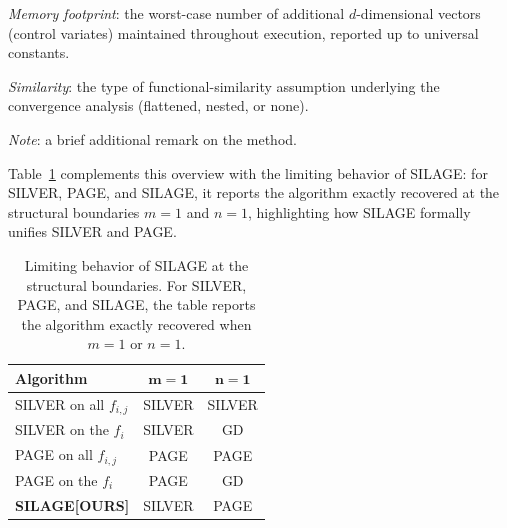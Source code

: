\documentclass{article}
\theoremstyle{plain}
\newcommand{\algname}[1]{{\sf\scalefont{0.88}\color{mydarkgreen}#1}\xspace}
\def\algname#1{#1}%
\begin{document}
\begin{table}[t]
\begin{threeparttable}
\begin{tablenotes}
\item [{\color{blue}(3)}] \emph{Memory footprint}: the worst-case number of additional $d$-dimensional vectors (control variates) maintained throughout execution, reported up to universal constants.
\item [{\color{blue}(4)}] \emph{Similarity}: the type of functional-similarity assumption underlying the convergence analysis (flattened, nested, or none).
\item [{\color{blue}(5)}] \emph{Note}: a brief additional remark on the method.
\end{tablenotes}
\end{threeparttable}
\end{table}

Table~\ref{tab:properties_comparison} complements this overview with the limiting behavior of \algname{SILAGE}: for \algname{SILVER}, \algname{PAGE}, and \algname{SILAGE}, it reports the algorithm exactly recovered at the structural boundaries $m=1$ and $n=1$, highlighting how \algname{SILAGE} formally unifies \algname{SILVER} and \algname{PAGE}.

\begin{table}[t]
\centering
\caption{Limiting behavior of \algname{SILAGE} at the structural boundaries. For \algname{SILVER}, \algname{PAGE}, and \algname{SILAGE}, the table reports the algorithm exactly recovered when $m=1$ or $n=1$.}
\label{tab:properties_comparison}
\vspace{2mm}
\renewcommand{\arraystretch}{1.4}
\begin{tabular}{l|cc}
\hline
\bf Algorithm & $\boldsymbol{m=1}$ & $\boldsymbol{n=1}$ \\
\hline \hline
\algname{SILVER} on all $f_{i,j}$ &  \algname{SILVER} &  \algname{SILVER} \\
\algname{SILVER} on the $f_i$ &  \algname{SILVER} &  \algname{GD} \\
\hline
\algname{PAGE} on all $f_{i,j}$ &  \algname{PAGE} &  \algname{PAGE} \\
\algname{PAGE} on the $f_i$ &  \algname{PAGE} &  \algname{GD} \\
\hline
\rowcolor{bgcolor} %
\textbf{\algname{SILAGE}[OURS]}  &  \algname{SILVER} & \algname{PAGE} \\
\hline
\end{tabular}
\end{table}
\end{document}
